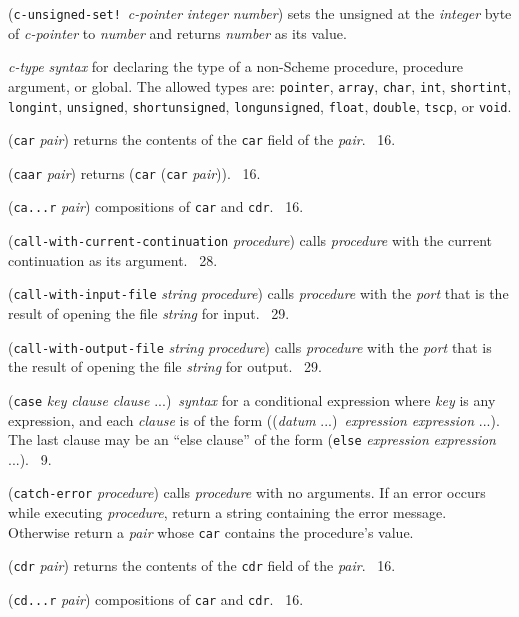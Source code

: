 \documentclass[10pt,twocolumn]{article}
\begin{document}
(\texttt{c-unsigned-set!}\ \emph{c-pointer} \emph{integer}
\emph{number}) sets the unsigned at the \emph{integer} byte of
\emph{c-pointer} to \emph{number} and returns \emph{number} as its
value.

\emph{c-type} \emph{syntax} for declaring the type of a non-Scheme
procedure, procedure argument, or global.  The allowed types are:
\texttt{pointer}, \texttt{array}, \texttt{char}, \texttt{int},
\texttt{shortint}, \texttt{longint}, \texttt{unsigned},
\texttt{shortunsigned}, \texttt{longunsigned}, \texttt{float},
\texttt{double}, \texttt{tscp}, or \texttt{void}.

(\texttt{car} \emph{pair}) returns the contents of the \texttt{car}
field of the \emph{pair}.  \RRRRRS~16.

(\texttt{caar} \emph{pair}) returns (\texttt{car} (\texttt{car}
\emph{pair})).  \RRRRRS~16.

(\texttt{ca...r} \emph{pair}) compositions of \texttt{car} and
\texttt{cdr}.  \RRRRRS~16.

(\texttt{call-with-current-continuation} \emph{procedure}) calls
\emph{procedure} with the current continuation as its argument.
\RRRRRS~28.

(\texttt{call-with-input-file} \emph{string} \emph{procedure}) calls
\emph{procedure} with the \emph{port} that is the result of opening
the file \emph{string} for input.  \RRRRRS~29.

(\texttt{call-with-output-file} \emph{string} \emph{procedure}) calls
\emph{procedure} with the \emph{port} that is the result of opening
the file \emph{string} for output.  \RRRRRS~29.

(\texttt{case} \emph{key} \emph{clause} \emph{clause}
...)\ \emph{syntax} for a conditional expression where \emph{key} is
any expression, and each \emph{clause} is of the form ((\emph{datum}
...)\ \emph{expression} \emph{expression} ...).  The last clause may
be an ``else clause'' of the form (\texttt{else} \emph{expression}
\emph{expression} ...).  \RRRRRS~9.

(\texttt{catch-error} \emph{procedure}) calls \emph{procedure} with no
arguments.  If an error occurs while executing \emph{procedure},
return a string containing the error message.  Otherwise return a
\emph{pair} whose \texttt{car} contains the procedure's value.

(\texttt{cdr} \emph{pair}) returns the contents of the \texttt{cdr}
field of the \emph{pair}.  \RRRRRS~16.

(\texttt{cd...r} \emph{pair}) compositions of \texttt{car} and
\texttt{cdr}.  \RRRRRS~16.
\end{document}
